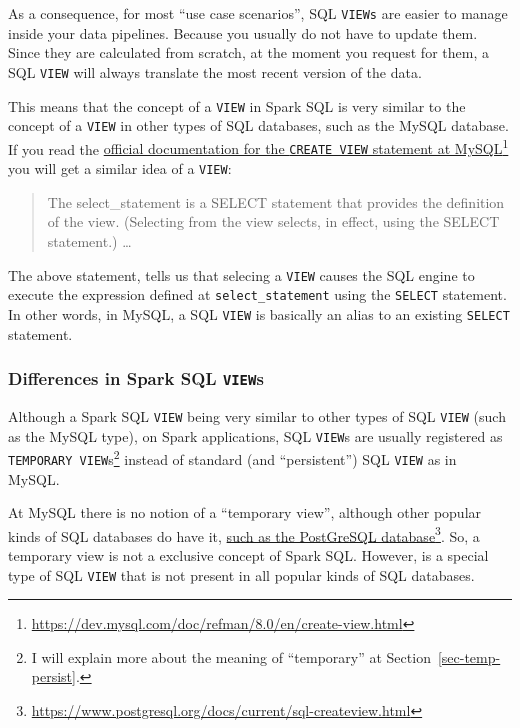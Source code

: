 \documentclass[
  11pt,
  letterpaper,
  DIV=11,
  numbers=noendperiod]{scrreprt}
\begin{document}
As a consequence, for most ``use case scenarios'', SQL \texttt{VIEWs}
are easier to manage inside your data pipelines. Because you usually do
not have to update them. Since they are calculated from scratch, at the
moment you request for them, a SQL \texttt{VIEW} will always translate
the most recent version of the data.

This means that the concept of a \texttt{VIEW} in Spark SQL is very
similar to the concept of a \texttt{VIEW} in other types of SQL
databases, such as the MySQL database. If you read the
\href{https://dev.mysql.com/doc/refman/8.0/en/create-view.html}{official
documentation for the \texttt{CREATE\ VIEW} statement at
MySQL}\footnote{\url{https://dev.mysql.com/doc/refman/8.0/en/create-view.html}}
you will get a similar idea of a \texttt{VIEW}:

\begin{quote}
The select\_statement is a SELECT statement that provides the definition
of the view. (Selecting from the view selects, in effect, using the
SELECT statement.) \ldots{}
\end{quote}

The above statement, tells us that selecing a \texttt{VIEW} causes the
SQL engine to execute the expression defined at
\texttt{select\_statement} using the \texttt{SELECT} statement. In other
words, in MySQL, a SQL \texttt{VIEW} is basically an alias to an
existing \texttt{SELECT} statement.

\hypertarget{differences-in-spark-sql-views}{%
\subsubsection{\texorpdfstring{Differences in Spark SQL
\texttt{VIEW}s}{Differences in Spark SQL VIEWs}}\label{differences-in-spark-sql-views}}

Although a Spark SQL \texttt{VIEW} being very similar to other types of
SQL \texttt{VIEW} (such as the MySQL type), on Spark applications, SQL
\texttt{VIEW}s are usually registered as
\texttt{TEMPORARY\ VIEW}s\footnote{I will explain more about the meaning
  of ``temporary'' at Section~\ref{sec-temp-persist}.} instead of
standard (and ``persistent'') SQL \texttt{VIEW} as in MySQL.

At MySQL there is no notion of a ``temporary view'', although other
popular kinds of SQL databases do have it,
\href{https://www.postgresql.org/docs/current/sql-createview.html}{such
as the PostGreSQL database}\footnote{\url{https://www.postgresql.org/docs/current/sql-createview.html}}.
So, a temporary view is not a exclusive concept of Spark SQL. However,
is a special type of SQL \texttt{VIEW} that is not present in all
popular kinds of SQL databases.
\end{document}
